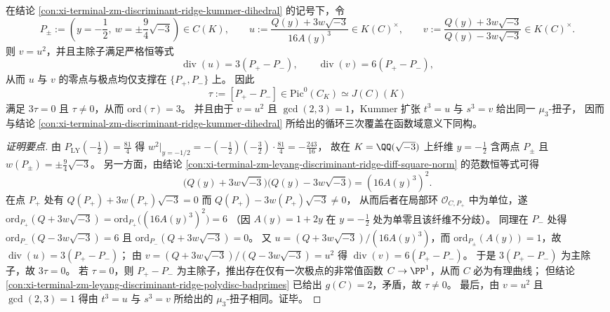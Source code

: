 

\begin{conclusion}\label{con:xi-terminal-zm-discriminant-ridge-kummer-divisor-3torsion}
在结论 \ref{con:xi-terminal-zm-discriminant-ridge-kummer-dihedral} 的记号下，令
\[
P_{\pm}:=\left(y=-\frac12,\ w=\pm\frac{9}{4}\sqrt{-3}\right)\in C(K),
\qquad
u:=\frac{Q(y)+3w\sqrt{-3}}{16A(y)^3}\in K(C)^{\times},
\qquad
v:=\frac{Q(y)+3w\sqrt{-3}}{Q(y)-3w\sqrt{-3}}\in K(C)^{\times}.
\]
则 \(v=u^{2}\)，并且主除子满足严格恒等式
\[
\operatorname{div}(u)=3(P_{+}-P_{-}),
\qquad
\operatorname{div}(v)=6(P_{+}-P_{-}),
\]
从而 \(u\) 与 \(v\) 的零点与极点均仅支撑在 \(\{P_{+},P_{-}\}\) 上。
因此
\[
\tau:=[P_{+}-P_{-}]\in \mathrm{Pic}^{0}(C_{K})\simeq J(C)(K)
\]
满足 \(3\tau=0\) 且 \(\tau\neq 0\)，从而 \(\mathrm{ord}(\tau)=3\)。
并且由于 \(v=u^{2}\) 且 \(\gcd(2,3)=1\)，Kummer 扩张 \(t^{3}=u\) 与 \(s^{3}=v\) 给出同一 \(\mu_{3}\)-扭子，
因而与结论 \ref{con:xi-terminal-zm-discriminant-ridge-kummer-dihedral} 所给出的循环三次覆盖在函数域意义下同构。
\end{conclusion}
\begin{proof}[证明要点]
由 \(P_{\mathrm{LY}}(-\tfrac12)=\tfrac{81}{4}\) 得
\(
w^{2}\bigl\vert_{y=-1/2}=-(-\tfrac12)(-\tfrac32)\cdot\tfrac{81}{4}=-\tfrac{243}{16}
\)，
故在 \(K=\QQ(\sqrt{-3})\) 上纤维 \(y=-\tfrac12\) 含两点 \(P_{\pm}\) 且 \(w(P_{\pm})=\pm\frac{9}{4}\sqrt{-3}\)。
另一方面，由结论 \ref{con:xi-terminal-zm-leyang-discriminant-ridge-diff-square-norm} 的范数恒等式可得
\[
\bigl(Q(y)+3w\sqrt{-3}\bigr)\bigl(Q(y)-3w\sqrt{-3}\bigr)=(16A(y)^{3})^{2}.
\]
在点 \(P_{+}\) 处有 \(Q(P_{+})+3w(P_{+})\sqrt{-3}=0\) 而 \(Q(P_{+})-3w(P_{+})\sqrt{-3}\neq 0\)，
从而后者在局部环 \(\mathcal O_{C,P_{+}}\) 中为单位，遂
\(
\mathrm{ord}_{P_{+}}(Q+3w\sqrt{-3})=\mathrm{ord}_{P_{+}}\!\bigl((16A(y)^{3})^{2}\bigr)=6
\)
（因 \(A(y)=1+2y\) 在 \(y=-\tfrac12\) 处为单零且该纤维不分歧）。
同理在 \(P_{-}\) 处得 \(\mathrm{ord}_{P_{-}}(Q-3w\sqrt{-3})=6\) 且 \(\mathrm{ord}_{P_{-}}(Q+3w\sqrt{-3})=0\)。
又 \(u=(Q+3w\sqrt{-3})/(16A(y)^{3})\)，而 \(\mathrm{ord}_{P_{\pm}}(A(y))=1\)，故
\(
\operatorname{div}(u)=3(P_{+}-P_{-})
\)；
由 \(v=(Q+3w\sqrt{-3})/(Q-3w\sqrt{-3})=u^{2}\) 得 \(\operatorname{div}(v)=6(P_{+}-P_{-})\)。
于是 \(3(P_{+}-P_{-})\) 为主除子，故 \(3\tau=0\)。
若 \(\tau=0\)，则 \(P_{+}-P_{-}\) 为主除子，推出存在仅有一次极点的非常值函数 \(C\to\PP^1\)，从而 \(C\) 必为有理曲线；
但结论 \ref{con:xi-terminal-zm-leyang-discriminant-ridge-polydisc-badprimes} 已给出 \(g(C)=2\)，矛盾，故 \(\tau\neq 0\)。
最后，由 \(v=u^{2}\) 且 \(\gcd(2,3)=1\) 得由 \(t^{3}=u\) 与 \(s^{3}=v\) 所给出的 \(\mu_3\)-扭子相同。证毕。
\end{proof}

